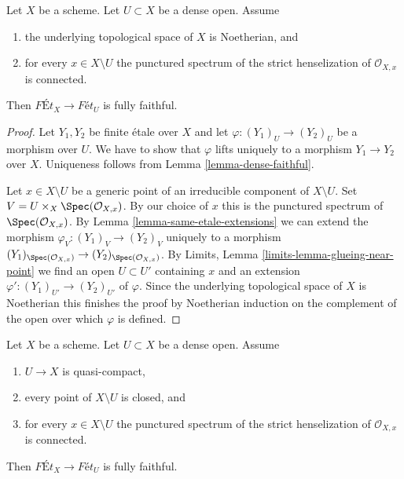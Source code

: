 \begin{lemma}
\label{lemma-quasi-compact-dense-open-connected-at-infinity-Noetherian}
Let $X$ be a scheme. Let $U \subset X$ be a dense open. Assume
\begin{enumerate}
\item the underlying topological space of $X$ is Noetherian, and
\item for every $x \in X \setminus U$ the punctured spectrum of the
strict henselization of $\mathcal{O}_{X, x}$ is connected.
\end{enumerate}
Then $\textit{F\'Et}_X \to \textit{F\'et}_U$ is fully faithful.
\end{lemma}

\begin{proof}
Let $Y_1, Y_2$ be finite \'etale over $X$ and let
$\varphi : (Y_1)_U \to (Y_2)_U$ be a morphism over $U$. We have to show that
$\varphi$ lifts uniquely to a morphism $Y_1 \to Y_2$ over $X$.
Uniqueness follows from Lemma \ref{lemma-dense-faithful}.

\medskip\noindent
Let $x \in X \setminus U$ be a generic point of an irreducible component
of $X \setminus U$. Set $V = U \times_X \Spec(\mathcal{O}_{X, x})$.
By our choice of $x$ this is the punctured spectrum of
$\Spec(\mathcal{O}_{X, x})$. By
Lemma \ref{lemma-same-etale-extensions}
we can extend the morphism $\varphi_V : (Y_1)_V \to (Y_2)_V$
uniquely to a morphism
$(Y_1)_{\Spec(\mathcal{O}_{X, x})} \to (Y_2)_{\Spec(\mathcal{O}_{X, x})}$.
By Limits, Lemma \ref{limits-lemma-glueing-near-point}
we find an open $U \subset U'$ containing $x$ and an extension
$\varphi' : (Y_1)_{U'} \to (Y_2)_{U'}$ of $\varphi$.
Since the underlying topological space of $X$ is Noetherian
this finishes the proof by Noetherian induction on the complement
of the open over which $\varphi$ is defined.
\end{proof}

\begin{lemma}
\label{lemma-retrocompact-dense-open-connected-at-infinity-closed}
Let $X$ be a scheme. Let $U \subset X$ be a dense open. Assume
\begin{enumerate}
\item $U \to X$ is quasi-compact,
\item every point of $X \setminus U$ is closed, and
\item for every $x \in X \setminus U$ the punctured spectrum of the
strict henselization of $\mathcal{O}_{X, x}$ is connected.
\end{enumerate}
Then $\textit{F\'Et}_X \to \textit{F\'et}_U$ is fully faithful.
\end{lemma}

